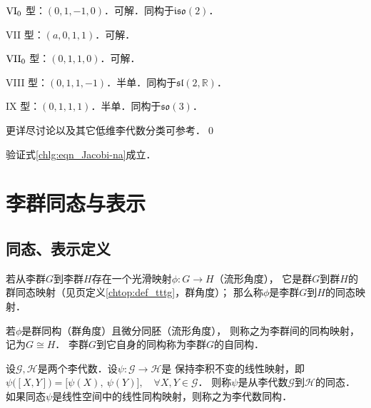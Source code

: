 {$\rm VI_0$ 型}：$(0,1,-1,0)$．可解．同构于$\mathfrak{iso}(2)$．

{VII 型}：$(a,0,1,1)$．可解．

{$\rm VII_0$ 型}：$(0,1,1,0)$．可解．

{VIII 型}：$(0,1,1,-1)$．半单．同构于$\mathfrak{sl}(2,\mathbb{R})$．

{IX 型}：$(0,1,1,1)$．半单．同构于$\mathfrak{so}(3)$．


更详尽讨论以及其它低维李代数分类可参考\parencite{Popovych_2003}．\qed

\begin{exercise}
	验证式\eqref{chlg:eqn_Jacobi-na}成立．
\end{exercise}


\section{李群同态与表示}\label{chlg:sec_liesg}


\subsection{同态、表示定义}\label{chlg:sec_lieiso}
\begin{definition}\label{chlg:def_homomorphism-LG}
    若从李群$G$到李群$H$存在一个{\kaishu 光滑映射}$\phi:G\to H$（流形角度），
    它是群$G$到群$H$的群同态映射（见\pageref{chtop:def_tttg}页定义\ref{chtop:def_tttg}，群角度）；
    那么称$\phi$是李群$G$到$H$的{\heiti 同态映射}．
    
    若$\phi$是群同构（群角度）且微分同胚（流形角度），
    则称之为李群间的{\heiti 同构映射}，记为$G \cong H$．
    李群$G$到它自身的同构称为李群$G$的{\heiti 自同构}．
\end{definition}


\begin{definition}\label{chlg:def_homomorphism-LA}
    设$\mathscr{G},\mathscr{H}$是两个李代数．设$\psi:\mathscr{G}\to \mathscr{H}$是
    保持李积不变的线性映射，即
       $ \psi\bigl([X, Y]\bigr) = \bigl[\psi(X),\ \psi(Y)\bigr],
        \quad \forall X, Y \in \mathscr{G} $．
    则称$\psi$是从李代数$\mathscr{G}$到$\mathscr{H}$的{\heiti 同态}．
    如果同态$\psi$是线性空间中的线性同构映射，则称之为李代数{\heiti 同构}．
\end{definition}

